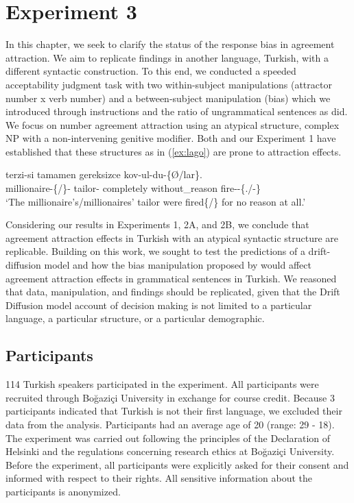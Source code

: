 \section{Experiment 3}

In this chapter, we seek to clarify the status of the response bias in agreement attraction. We aim to replicate \cites{HammerlyEtAl2019} findings in another language, Turkish, with a different syntactic construction. To this end, we conducted a speeded acceptability judgment task with two within-subject manipulations (attractor number x verb number) and a between-subject manipulation (bias) which we introduced through instructions and the ratio of ungrammatical sentences as  did. We focus on number agreement attraction using an atypical structure, complex NP with a non-intervening genitive modifier. Both  and our Experiment 1 have established that these structures as in (\ref{ex:lago}) are prone to attraction effects.

\ea \label{ex:lago} 
   {terzi-si} tamamen gereksizce kov-ul-du-\{\O/lar\}.\\
  millionaire-\{\Sg/\Pl\}-\Gen{} tailor-\Poss{} completely without\_reason fire-\Pass-\Pst\{.\Tsg/-\Tpl\}\\
  \glt `The millionaire's/millionaires' tailor were fired\{\Sg/\Pl\} for no reason at all.'
\z

Considering our results in Experiments 1, 2A, and 2B, we conclude that agreement attraction effects in Turkish with an atypical syntactic structure are replicable. Building on this work, we sought to test the predictions of a drift-diffusion model and how the bias manipulation proposed by  would affect agreement attraction effects in grammatical sentences in Turkish. We reasoned that \cites{HammerlyEtAl2019} data, manipulation, and findings should be replicated, given that the Drift Diffusion model account of decision making is not limited to a particular language, a particular structure, or a particular demographic.



\subsection{Participants}

114 Turkish speakers participated in the experiment. All participants were recruited through Bo\u{g}azi\c{c}i University in exchange for course credit. Because 3 participants indicated that Turkish is not their first language, we excluded their data from the analysis. Participants had an average age of 20 (range: 29 - 18). The experiment was carried out following the principles of the Declaration of Helsinki and the regulations concerning research ethics at Bo\u{g}azi\c{c}i University. Before the experiment, all participants were explicitly asked for their consent and informed with respect to their rights. All sensitive information about the participants is anonymized.


